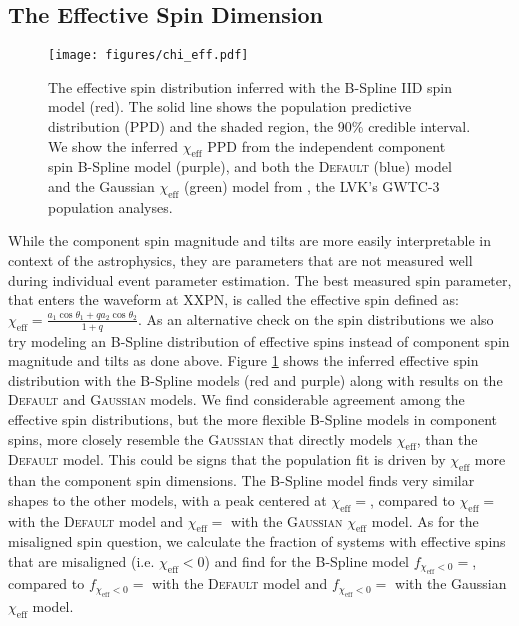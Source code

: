 \subsection{The Effective Spin Dimension}

\begin{figure} 
    \begin{centering}
        \texttt{[image: figures/chi\_eff.pdf]}
        \caption{The effective spin distribution inferred with the B-Spline IID spin model (red). The solid line shows the population predictive 
        distribution (PPD) and the shaded region, the 90\% credible interval. We show the inferred $\chi_\mathrm{eff}$ 
        PPD from the independent component spin B-Spline model (purple), and both the \textsc{Default} (blue) model and the 
        Gaussian $\chi_\mathrm{eff}$ (green) model from \citet{o3b_astro_dist}, the LVK's GWTC-3 population analyses.}
        \label{fig:chieff_dist}
    \end{centering}
\end{figure}

While the component spin magnitude and tilts are more easily interpretable in context of the astrophysics, they are parameters that 
are not measured well during individual event parameter estimation. The best measured spin parameter, that enters the waveform at XXPN, is 
called the effective spin defined as: $\chi_\mathrm{eff} = \frac{a_1\cos{\theta_1} + qa_2\cos{\theta_2}}{1+q}$. As an alternative check 
on the spin distributions we also try modeling an B-Spline distribution of effective spins instead of component spin magnitude and tilts 
as done above. Figure \ref{fig:chieff_dist} shows the inferred effective spin distribution with the B-Spline models (red and purple) 
along with results on the \textsc{Default} and \textsc{Gaussian} models. We find considerable agreement 
among the effective spin distributions, but the more flexible B-Spline models in component spins, more closely resemble the \textsc{Gaussian} 
that directly models $\chi_\mathrm{eff}$, than the \textsc{Default} model. This could be signs that the population fit is driven by $\chi_\mathrm{eff}$ 
more than the component spin dimensions. The B-Spline model finds very similar shapes to the other models, with a peak centered at 
$\chi_\mathrm{eff}=$\result{$\CIPlusMinus{\macros[ChiEffective][iid][PeakChiEff]}$}, compared to 
$\chi_\mathrm{eff}=$\result{$\CIPlusMinus{\macros[ChiEffective][default][PeakChiEff]}$} with the \textsc{Default} model and 
$\chi_\mathrm{eff}=$\result{$\CIPlusMinus{\macros[ChiEffective][gaussian][PeakChiEff]}$} with the \textsc{Gaussian} $\chi_\mathrm{eff}$ model. 
As for the misaligned spin question, we calculate the fraction of systems with effective spins that are misaligned (i.e. $\chi_\mathrm{eff}<0$) and 
find for the B-Spline model $f_{\chi_\mathrm{eff}<0}=$\result{$\CIPlusMinus{\macros[ChiEffective][iid][FracBelow0]}$}, compared to 
$f_{\chi_\mathrm{eff}<0}=$\result{$\CIPlusMinus{\macros[ChiEffective][default][FracBelow0]}$} with the \textsc{Default} model and 
$f_{\chi_\mathrm{eff}<0}=$\result{$\CIPlusMinus{\macros[ChiEffective][gaussian][FracBelow0]}$} with the Gaussian $\chi_\mathrm{eff}$ model.

